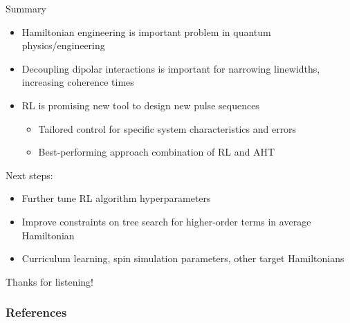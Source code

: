 \documentclass{beamer}
\begin{document}
\begin{frame}{Summary}

\begin{itemize}
    \item Hamiltonian engineering is important problem in quantum physics/engineering
    \item Decoupling dipolar interactions is important for narrowing linewidths, increasing coherence times
    \item RL is promising new tool to design new pulse sequences
    \begin{itemize}
        \item Tailored control for specific system characteristics and errors
        \item Best-performing approach combination of RL and AHT
    \end{itemize}
\end{itemize}

\pause

Next steps:
\begin{itemize}
    \item Further tune RL algorithm hyperparameters
    \item Improve constraints on tree search for higher-order terms in average Hamiltonian
    \item Curriculum learning, spin simulation parameters, other target Hamiltonians
\end{itemize}

\pause

\begin{center}
    Thanks for listening!
\end{center}

\end{frame}



\begin{frame}[allowframebreaks]
\frametitle{References}

\printbibliography

\end{frame}
\end{document}
